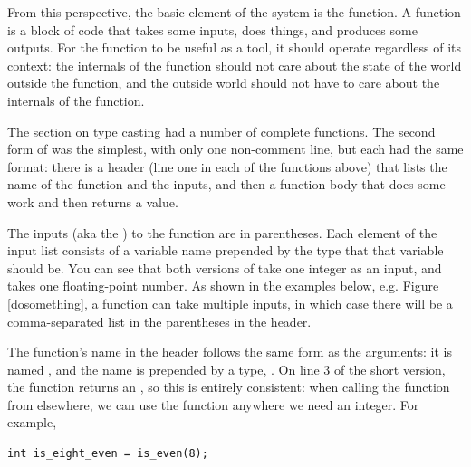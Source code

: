 \documentclass[12pt]{article}
\begin{document}
From this perspective, the basic element of the system is the function.
A function is a block of code that takes some inputs, does things,
and produces some outputs. For the function to be useful as a tool, it
should operate regardless of its context: the internals of the function
should not care about the state of the world outside the function, and
the outside world should not have to care about the internals of the
function.

The section on type casting had a number of complete functions. The
second form of  was the simplest, with only one 
non-comment line, but each had the same format: there is a header (line
one in each of the functions above) that lists the name of the function
and the inputs, and then a function body that does some work and then
returns a value.

The inputs (aka the ) to the function
are in parentheses. Each element of the input
list consists of a variable name prepended by the type that that
variable should be. You can see that both versions of 
take one integer as an input, and
 takes one floating-point number.
As shown in the examples below, e.g. Figure \ref{dosomething}, a
function can take multiple inputs, in which case there will be a
comma-separated list in the parentheses in the header.

The function's name in the header follows the same form as the arguments:
it is named , and the name is prepended by a type,
.  On line 3 of the short version, the function returns
an , so this is entirely consistent: when calling the
function from elsewhere, we can use the function anywhere we need an
integer. For example,
\begin{lstlisting}
int is_eight_even = is_even(8);
\end{lstlisting}


\end{document}
